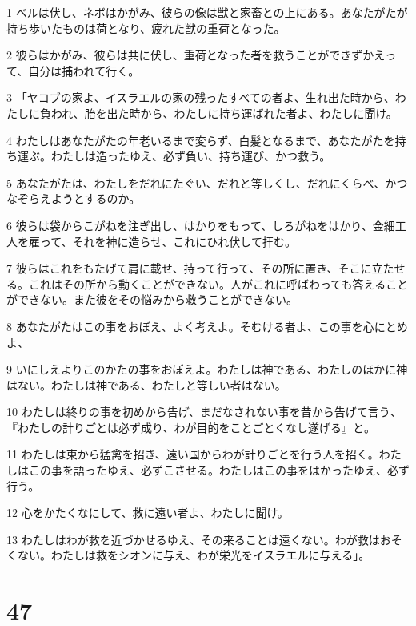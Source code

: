 \par 1 ベルは伏し、ネボはかがみ、彼らの像は獣と家畜との上にある。あなたがたが持ち歩いたものは荷となり、疲れた獣の重荷となった。
\par 2 彼らはかがみ、彼らは共に伏し、重荷となった者を救うことができずかえって、自分は捕われて行く。
\par 3 「ヤコブの家よ、イスラエルの家の残ったすべての者よ、生れ出た時から、わたしに負われ、胎を出た時から、わたしに持ち運ばれた者よ、わたしに聞け。
\par 4 わたしはあなたがたの年老いるまで変らず、白髪となるまで、あなたがたを持ち運ぶ。わたしは造ったゆえ、必ず負い、持ち運び、かつ救う。
\par 5 あなたがたは、わたしをだれにたぐい、だれと等しくし、だれにくらべ、かつなぞらえようとするのか。
\par 6 彼らは袋からこがねを注ぎ出し、はかりをもって、しろがねをはかり、金細工人を雇って、それを神に造らせ、これにひれ伏して拝む。
\par 7 彼らはこれをもたげて肩に載せ、持って行って、その所に置き、そこに立たせる。これはその所から動くことができない。人がこれに呼ばわっても答えることができない。また彼をその悩みから救うことができない。
\par 8 あなたがたはこの事をおぼえ、よく考えよ。そむける者よ、この事を心にとめよ、
\par 9 いにしえよりこのかたの事をおぼえよ。わたしは神である、わたしのほかに神はない。わたしは神である、わたしと等しい者はない。
\par 10 わたしは終りの事を初めから告げ、まだなされない事を昔から告げて言う、『わたしの計りごとは必ず成り、わが目的をことごとくなし遂げる』と。
\par 11 わたしは東から猛禽を招き、遠い国からわが計りごとを行う人を招く。わたしはこの事を語ったゆえ、必ずこさせる。わたしはこの事をはかったゆえ、必ず行う。
\par 12 心をかたくなにして、救に遠い者よ、わたしに聞け。
\par 13 わたしはわが救を近づかせるゆえ、その来ることは遠くない。わが救はおそくない。わたしは救をシオンに与え、わが栄光をイスラエルに与える」。

\chapter{47}

